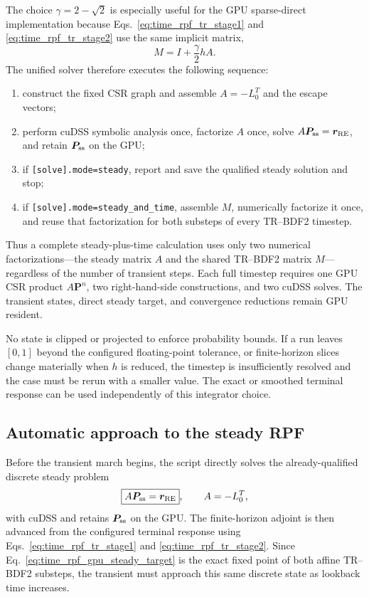 \documentclass[11pt]{article}
\begin{document}
The choice $\gamma=2-\sqrt2$ is especially useful for the GPU sparse-direct implementation
because Eqs.~\eqref{eq:time_rpf_tr_stage1} and \eqref{eq:time_rpf_tr_stage2} use the same
implicit matrix,
\begin{equation}
 \boxed{M=I+\frac{\gamma}{2}hA.}
 \label{eq:time_rpf_tr_matrix}
\end{equation}
The unified solver therefore executes the following sequence:
\begin{enumerate}
 \item construct the fixed CSR graph and assemble $A=-L_0^T$ and the escape vectors;
 \item perform cuDSS symbolic analysis once, factorize $A$ once, solve
       $A\bm P_{\rm ss}=\bm r_{\rm RE}$, and retain $\bm P_{\rm ss}$ on the GPU;
 \item if \texttt{[solve].mode=steady}, report and save the qualified steady solution and stop;
 \item if \texttt{[solve].mode=steady\_and\_time}, assemble $M$, numerically factorize it
       once, and reuse that factorization for both substeps of every TR--BDF2 timestep.
\end{enumerate}
Thus a complete steady-plus-time calculation uses only two numerical factorizations---the
steady matrix $A$ and the shared TR--BDF2 matrix $M$---regardless of the number of transient
steps.  Each full timestep requires one GPU CSR product $A\bm P^n$, two right-hand-side
constructions, and two cuDSS solves.  The transient states, direct steady target, and convergence
reductions remain GPU resident.

No state is clipped or projected to enforce probability bounds.  If a run leaves $[0,1]$ beyond
the configured floating-point tolerance, or finite-horizon slices change materially when $h$ is
reduced, the timestep is insufficiently resolved and the case must be rerun with a smaller value.
The exact or smoothed terminal response can be used independently of this integrator choice.

\subsection{Automatic approach to the steady RPF}
\label{sec:time_adjoint_steady_stop}

Before the transient march begins, the script directly solves the already-qualified discrete
steady problem
\begin{equation}
 \boxed{A\bm P_{\rm ss}=\bm r_{\rm RE}},
 \qquad A=-L_0^T,
 \label{eq:time_rpf_gpu_steady_target}
\end{equation}
with cuDSS and retains $\bm P_{\rm ss}$ on the GPU.  The finite-horizon adjoint is then
advanced from the configured terminal response using Eqs.~\eqref{eq:time_rpf_tr_stage1} and
\eqref{eq:time_rpf_tr_stage2}.  Since Eq.~\eqref{eq:time_rpf_gpu_steady_target} is the exact
fixed point of both affine TR--BDF2 substeps, the transient must approach this same discrete state as
lookback time increases.
\end{document}

